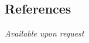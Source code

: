 \documentclass[margin,line]{resume}
\begin{document}
\begin{resume}
\vspace{-0.3cm}

\section{\mysidestyle References}
\textsl{Available upon request}



\end{resume}
\end{document}
